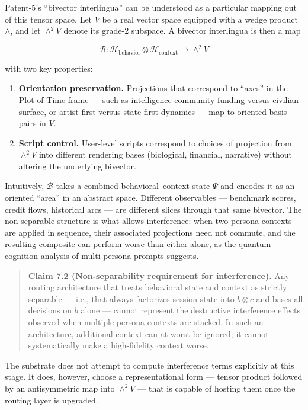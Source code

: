 Patent-5's ``bivector interlingua'' can be understood as a particular
mapping out of this tensor space. Let \(V\) be a real vector space
equipped with a wedge product \(\wedge\), and let \(\wedge^2 V\) denote
its grade-2 subspace. A bivector interlingua is then a map

\[
\mathcal{B} : \mathcal{H}_{\text{behavior}} \otimes \mathcal{H}_{\text{context}} \to \wedge^2 V
\]

with two key properties:

\begin{enumerate}
\def\labelenumi{\arabic{enumi}.}
\tightlist
\item
  \textbf{Orientation preservation.} Projections that correspond to
  ``axes'' in the Plot of Time frame --- such as intelligence-community
  funding versus civilian surface, or artist-first versus state-first
  dynamics --- map to oriented basis pairs in \(V\).
\item
  \textbf{Script control.} User-level scripts correspond to choices of
  projection from \(\wedge^2 V\) into different rendering bases
  (biological, financial, narrative) without altering the underlying
  bivector.
\end{enumerate}

Intuitively, \(\mathcal{B}\) takes a combined behavioral--context state
\(\Psi\) and encodes it as an oriented ``area'' in an abstract space.
Different observables --- benchmark scores, credit flows, historical
arcs --- are different slices through that same bivector. The
non-separable structure is what allows interference: when two persona
contexts are applied in sequence, their associated projections need not
commute, and the resulting composite can perform worse than either
alone, as the quantum-cognition analysis of multi-persona prompts
suggests.

\begin{quote}
\textbf{Claim 7.2 (Non-separability requirement for interference).} Any
routing architecture that treats behavioral state and context as
strictly separable --- i.e., that always factorizes session state into
\(b \otimes c\) and bases all decisions on \(b\) alone --- cannot
represent the destructive interference effects observed when multiple
persona contexts are stacked. In such an architecture, additional
context can at worst be ignored; it cannot systematically make a
high-fidelity context worse.
\end{quote}

The substrate does not attempt to compute interference terms explicitly
at this stage. It does, however, choose a representational form ---
tensor product followed by an antisymmetric map into \(\wedge^2 V\) ---
that is capable of hosting them once the routing layer is upgraded.

